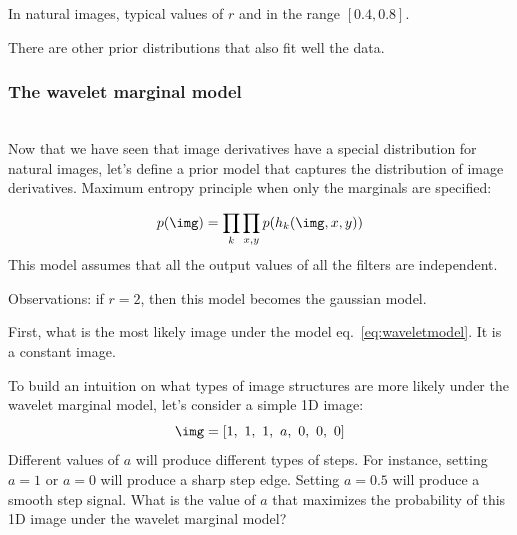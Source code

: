 
In natural images, typical values of $r$ and in the range $\left[0.4, 0.8\right]$. 



There are other prior distributions that also fit well the data.



\subsubsection{The wavelet marginal model}
~\\

Now that we have seen that image derivatives have a special distribution for natural images, let's define a prior model that captures the distribution of image derivatives. Maximum entropy principle when only the marginals are specified:

\begin{equation}
p(\img) = \prod_{k} \prod_{x,y} p(h_k(\img, x,y))
\label{eq:waveletmodel}
\end{equation}
This model assumes that all the output values of all the filters are independent.

Observations: if $r = 2$, then this model becomes the gaussian model.


%
%
%

First, what is the most likely image under the model eq.~\ref{eq:waveletmodel}. It is a constant image. 


To build an intuition on what types of image structures are more likely under the wavelet marginal model, let's consider a simple 1D image:
\begin{equation}
\img = \left[1,~ 1,~ 1,~ a,~ 0,~ 0,~ 0\right]
\end{equation}
Different values of $a$ will produce different types of steps. For instance, setting $a=1$ or $a=0$ will produce a sharp step edge. Setting $a=0.5$ will produce a smooth step signal. What is the value of $a$ that maximizes the probability of this 1D image under the wavelet marginal model? 

